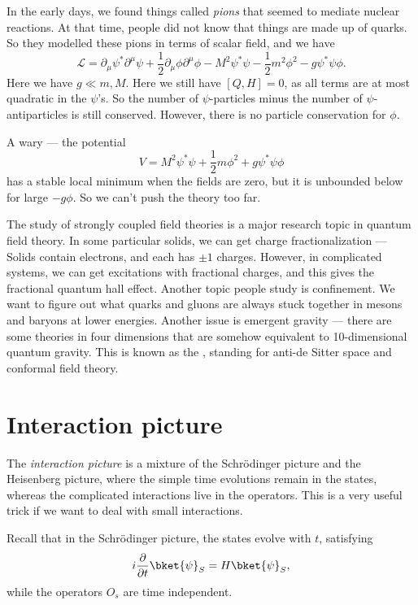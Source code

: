 \documentclass[a4paper]{article}
\begin{document}
\begin{eg}
  In the early days, we found things called \emph{pions} that seemed to mediate nuclear reactions. At that time, people did not know that things are made up of quarks. So they modelled these pions in terms of scalar field, and we have
  \[
    \mathcal{L} = \partial_\mu \psi^* \partial^\mu \psi + \frac{1}{2} \partial_\mu \phi \partial^\mu \phi - M^2 \psi^* \psi - \frac{1}{2} m^2 \phi^2 - g \psi^* \psi \phi.
  \]
  Here we have $g \ll m, M$. Here we still have $[Q, H] = 0$, as all terms are at most quadratic in the $\psi$'s. So the number of $\psi$-particles minus the number of $\psi$-antiparticles is still conserved. However, there is no particle conservation for $\phi$.

  A wary --- the potential
  \[
    V = M^2 \psi^* \psi + \frac{1}{2} m \phi^2 + g \psi^*\psi \phi
  \]
  has a stable local minimum when the fields are zero, but it is unbounded below for large $-g \phi$. So we can't push the theory too far.
\end{eg}
The study of strongly coupled field theories is a major research topic in quantum field theory. In some particular solids, we can get charge fractionalization --- Solids contain electrons, and each has $\pm 1$ charges. However, in complicated systems, we can get excitations with fractional charges, and this gives the fractional quantum hall effect. Another topic people study is confinement. We want to figure out what quarks and gluons are always stuck together in mesons and baryons at lower energies. Another issue is emergent gravity --- there are some theories in four dimensions that are somehow equivalent to 10-dimensional quantum gravity. This is known as the , standing for anti-de Sitter space and conformal field theory.

\section{Interaction picture}
The \emph{interaction picture} is a mixture of the Schr\"odinger picture and the Heisenberg picture, where the simple time evolutions remain in the states, whereas the complicated interactions live in the operators. This is a very useful trick if we want to deal with small interactions.

Recall that in the Schr\"odinger picture, the states evolve with $t$, satisfying
\[
  i \frac{\partial}{\partial t}\bket{\psi}_S = H \bket{\psi}_S,
\]
while the operators $O_s$ are time independent.
\end{document}
